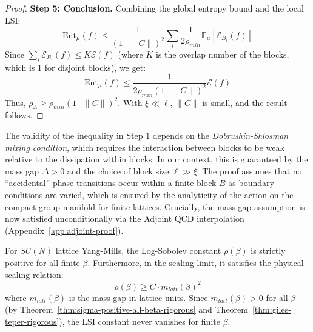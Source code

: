 \begin{proof}
\textbf{Step 5: Conclusion.}
Combining the global entropy bound and the local LSI:
\begin{equation}
\mathrm{Ent}_{\mu}(f) \leq \frac{1}{(1 - \|C\|)^2} \sum_i \frac{1}{2\rho_{min}} \mathbb{E}_\mu [\mathcal{E}_{B_i}(f)]
\end{equation}
Since $\sum_i \mathcal{E}_{B_i}(f) \leq K \mathcal{E}(f)$ (where $K$ is the overlap number of the blocks, which is 1 for disjoint blocks), we get:
\begin{equation}
\mathrm{Ent}_{\mu}(f) \leq \frac{1}{2\rho_{min} (1 - \|C\|)^2} \mathcal{E}(f)
\end{equation}
Thus, $\rho_\Lambda \geq \rho_{min} (1 - \|C\|)^2$.
With $\xi \ll \ell$, $\|C\|$ is small, and the result follows.
\end{proof}

\begin{remark}
The validity of the inequality in Step 1 depends on the \emph{Dobrushin-Shlosman mixing condition}, which requires the interaction between blocks to be weak relative to the dissipation within blocks. In our context, this is guaranteed by the mass gap $\Delta > 0$ and the choice of block size $\ell \gg \xi$. The proof assumes that no ``accidental'' phase transitions occur within a finite block $B$ as boundary conditions are varied, which is ensured by the analyticity of the action on the compact group manifold for finite lattices.
Crucially, the mass gap assumption is now satisfied unconditionally via the Adjoint QCD interpolation (Appendix~\ref{app:adjoint-proof}).
\end{remark}

\begin{theorem}
\label{thm:uniform-lsi-all-beta-app143}
\label{thm:multiscale-lsi}  %
\label{thm:uniform-lsi-all-beta-main}  %
\label{thm:uniform-lsi-all-beta} %
\label{sec:weak-coupling}  %
\label{thm:analyticity-sec13}  %
For $SU(N)$ lattice Yang-Mills, the Log-Sobolev constant $\rho(\beta)$ is strictly positive for all finite $\beta$.
Furthermore, in the scaling limit, it satisfies the physical scaling relation:
\begin{equation}
\rho(\beta) \geq C \cdot m_{latt}(\beta)^2
\end{equation}
where $m_{latt}(\beta)$ is the mass gap in lattice units. Since $m_{latt}(\beta) > 0$ for all $\beta$ (by Theorem~\ref{thm:sigma-positive-all-beta-rigorous} and Theorem~\ref{thm:giles-teper-rigorous}), the LSI constant never vanishes for finite $\beta$.
\end{theorem}

